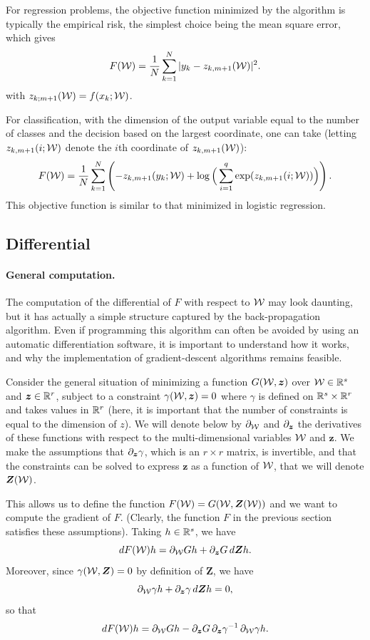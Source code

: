 For regression problems, the objective function minimized by the algorithm is typically the empirical risk, the simplest choice being the mean square error, which gives
\[
F({\mathcal W}) = \frac1N \sum_{k=1}^N |y_k - z_{k,m+1}({\mathcal W})|^2.
\]
with $z_{k;m+1}({\mathcal W}) = f(x_k; {\mathcal W})$.

For classification, with the dimension of the output variable equal to the number of classes and the decision based on the largest coordinate, one can take (letting  $z_{k,m+1}(i;{\mathcal W})$ denote the $i$th coordinate of $z_{k,m+1}({\mathcal W})$):
\[
F({\mathcal W}) = \frac1N \sum_{k=1}^N \left(-z_{k,m+1}(y_k;{\mathcal W}) + \log \Big(\sum_{i=1}^q \exp(z_{k,m+1}(i;{\mathcal W}))\Big)\right).
\]
 This  objective function is similar to that minimized in logistic regression.

\subsection{Differential}
\label{sec:nn.der}
\paragraph{General computation.}
 The computation of the differential of $F$ with respect to ${\mathcal W}$ may look daunting, but it has actually a simple structure captured by the back-propagation algorithm.
Even if programming this algorithm can often be avoided by using an automatic differentiation software, it is important to understand how it works, and why the implementation of gradient-descent algorithms remains feasible. 

Consider the general situation of minimizing a function $G({\mathcal W}, \bm z)$ over ${\mathcal W}\in {\mathbb{R}}^s$ and $\bm z \in {\mathbb{R}}^r$, subject to a constraint $\gamma({\mathcal W}, \bm z) = 0$ where $\gamma$ is defined on ${\mathbb{R}}^s \times {\mathbb{R}}^r$ and takes values in ${\mathbb{R}}^r$ (here, it is important that the number of constraints is equal to the dimension of $z$). We will denote below by $\partial_{\mathcal W}$ and $\partial_{\bm z}$ the derivatives of these functions with respect to the multi-dimensional variables ${\mathcal W}$ and $\boldsymbol z$. We make the assumptions that $\partial_{\bm z}\gamma$, which is an $r\times r$ matrix, is invertible, and that 
the constraints can be solved to express $\boldsymbol z$ as a function of ${\mathcal W}$, that we will denote $\bm Z({\mathcal W})$. 

This allows us to define the function $F({\mathcal W}) = G({\mathcal W}, \bm Z({\mathcal W}))$ and we want to compute the gradient of $F$. (Clearly, the function $F$ in the previous section satisfies these assumptions). 
Taking $h\in {\mathbb{R}}^s$, we have
\[
dF({\mathcal W}) h = \partial_{\mathcal W} G h + \partial_{\bm z} G\, d\bm Z h.
\]
Moreover, since $\gamma({\mathcal W}, \bm Z) = 0$ by definition of $\boldsymbol Z$, we have
\[
\partial_{{\mathcal W}} \gamma h + \partial_{\bm z}\gamma\, d\bm Z h = 0, 
\]
so that
\[
dF({\mathcal W}) h = \partial_{\mathcal W} G h - \partial_{\bm z} G \, \partial_{\bm z}\gamma^{-1}\,  \partial_{{\mathcal W}} \gamma h.
\]

